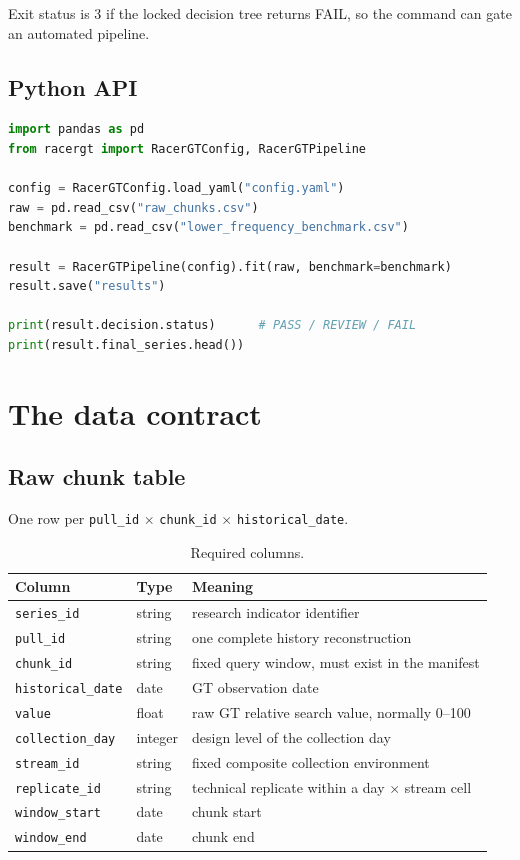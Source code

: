 \documentclass[12pt,a4paper,oneside]{article}
\begin{document}
Exit status is 3 if the locked decision tree returns FAIL, so the command can
gate an automated pipeline.

\subsection{Python API}

\begin{lstlisting}[language=Python]
import pandas as pd
from racergt import RacerGTConfig, RacerGTPipeline

config = RacerGTConfig.load_yaml("config.yaml")
raw = pd.read_csv("raw_chunks.csv")
benchmark = pd.read_csv("lower_frequency_benchmark.csv")

result = RacerGTPipeline(config).fit(raw, benchmark=benchmark)
result.save("results")

print(result.decision.status)      # PASS / REVIEW / FAIL
print(result.final_series.head())
\end{lstlisting}

\section{The data contract}\label{sec:contract}

\subsection{Raw chunk table}

One row per \texttt{pull\_id} $\times$ \texttt{chunk\_id} $\times$
\texttt{historical\_date}.

\begin{table}[H]
\centering\small
\caption{Required columns.}
\begin{tabularx}{\textwidth}{llX}
\toprule
Column & Type & Meaning\\
\midrule
\texttt{series\_id} & string & research indicator identifier\\
\texttt{pull\_id} & string & one complete history reconstruction\\
\texttt{chunk\_id} & string & fixed query window, must exist in the manifest\\
\texttt{historical\_date} & date & GT observation date\\
\texttt{value} & float & raw GT relative search value, normally 0--100\\
\texttt{collection\_day} & integer & design level of the collection day\\
\texttt{stream\_id} & string & fixed composite collection environment\\
\texttt{replicate\_id} & string & technical replicate within a day $\times$ stream cell\\
\texttt{window\_start} & date & chunk start\\
\texttt{window\_end} & date & chunk end\\
\bottomrule
\end{tabularx}
\end{table}
\end{document}
